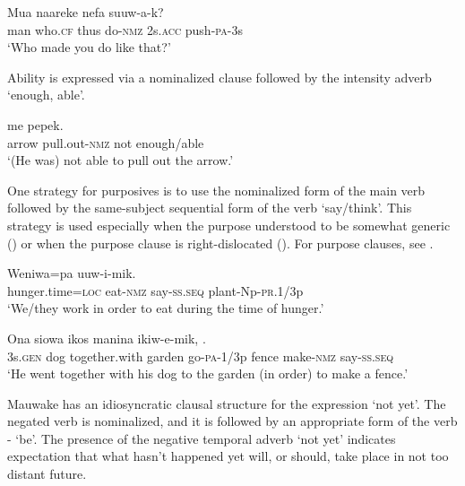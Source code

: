 \ea%
\label{ex:x1252}
\gll Mua  naareke     nefa  suuw-a-k? \\
     man  who.\textsc{cf}  thus  do-\textsc{nmz}  2s.\textsc{acc}  push-\textsc{pa}-3s \\
\glt `Who made you do like that?'
\z

Ability is expressed via a nominalized clause followed by the intensity adverb  `enough, able'.

\ea%
\label{ex:x1251}
\gll {}   me  pepek. \\
     arrow  pull.out-\textsc{nmz}  not  enough/able \\
\glt `(He was) not able to pull out the arrow.'
\z

One strategy for purposives is to use the nominalized form of the main verb followed by the same-subject sequential form  of the verb `say/think'. This strategy is used especially when the purpose understood to be somewhat generic () or when the purpose clause is right-dislocated (). For purpose clauses, see .

\ea%
\label{ex:x1253}
\gll Weniwa=pa     uuw-i-mik. \\
     hunger.time=\textsc{loc}  eat-\textsc{nmz}  say-\textsc{ss}.\textsc{seq}  plant-Np-\textsc{pr}.1/3p \\
\glt `We/they work in order to eat during the time of hunger.'
\z

\ea%
\label{ex:x1255}
\gll Ona  siowa  ikos  manina  ikiw-e-mik,   \textstyleEmphasizedVernacularWords{-} \textstyleEmphasizedVernacularWords{-}.
 \\
     3s.\textsc{gen}  dog  together.with  garden  go-\textsc{pa}-1/3p  fence make-\textsc{nmz}  say-\textsc{ss}.\textsc{seq} \\
\glt `He went together with his dog to the garden (in order) to make a fence.'
\z

Mauwake has an idiosyncratic clausal structure for the expression `not yet'. The negated verb is nominalized, and it is followed by an appropriate form of the verb - `be'.  The presence of the negative temporal adverb  `not yet' indicates expectation that what hasn't happened yet will, or should, take place in not too distant future.  

